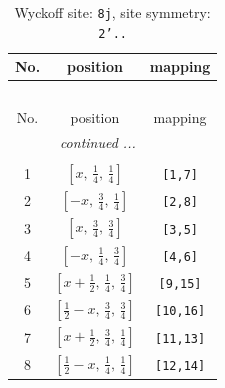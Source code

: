 \documentclass[fleqn,8pt]{jsarticle}
\begin{document}
\begin{longtable}{ccc}
\caption{Wyckoff site: {\tt 8j}, site symmetry: {\tt 2'..}}
 \\
 \hline \hline
No. & position & mapping \\ \hline \endfirsthead

\multicolumn{2}{l}{\tablename\ \thetable{}} \\
 \hline \hline
No. & position & mapping \\ \hline \endhead

 \hline \hline
\multicolumn{2}{r}{\footnotesize\it continued ...} \\ \endfoot

 \hline \hline
\multicolumn{2}{r}{} \\ \endlastfoot

1 & $\left[ x,\, \frac{1}{4},\, \frac{1}{4} \right]$ & {\tt [1,7]} \\ \hline
2 & $\left[ - x,\, \frac{3}{4},\, \frac{1}{4} \right]$ & {\tt [2,8]} \\ \hline
3 & $\left[ x,\, \frac{3}{4},\, \frac{3}{4} \right]$ & {\tt [3,5]} \\ \hline
4 & $\left[ - x,\, \frac{1}{4},\, \frac{3}{4} \right]$ & {\tt [4,6]} \\ \hline
5 & $\left[ x + \frac{1}{2},\, \frac{1}{4},\, \frac{3}{4} \right]$ & {\tt [9,15]} \\ \hline
6 & $\left[ \frac{1}{2} - x,\, \frac{3}{4},\, \frac{3}{4} \right]$ & {\tt [10,16]} \\ \hline
7 & $\left[ x + \frac{1}{2},\, \frac{3}{4},\, \frac{1}{4} \right]$ & {\tt [11,13]} \\ \hline
8 & $\left[ \frac{1}{2} - x,\, \frac{1}{4},\, \frac{1}{4} \right]$ & {\tt [12,14]} \\
\end{longtable}
\renewcommand{\arraystretch}{1.2}
\end{document}
